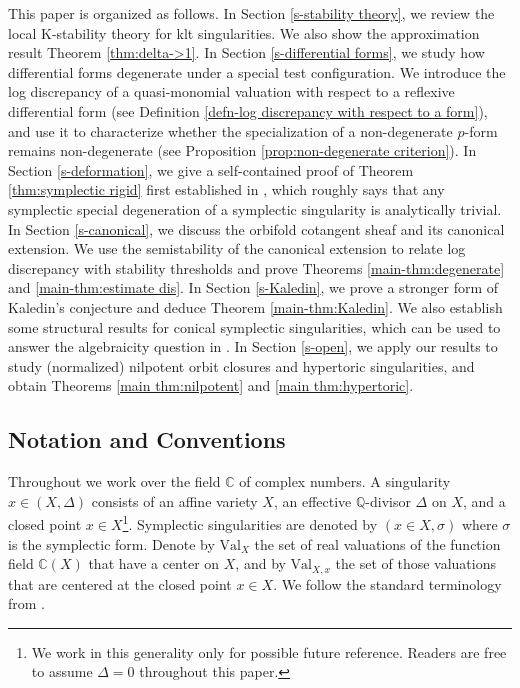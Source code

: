 \documentclass[12pt]{amsart}
\theoremstyle{definition}
\newcommand{\bC}{\mathbb{C}}
\newcommand{\bQ}{\mathbb{Q}}
\newcommand{\Val}{\mathrm{Val}}
\numberwithin{equation}{section}
\begin{document}
\medskip

This paper is organized as follows. In Section \ref{s-stability theory}, we review the local K-stability theory for klt singularities. We also show the approximation result Theorem \ref{thm:delta->1}. In Section \ref{s-differential forms}, we study how differential forms degenerate under a special test configuration. We introduce  the log discrepancy of a quasi-monomial valuation with respect to a reflexive differential form (see Definition \ref{defn-log discrepancy with respect to a form}), and use it to characterize whether the specialization of a non-degenerate $p$-form remains non-degenerate (see Proposition \ref{prop:non-degenerate criterion}). In Section \ref{s-deformation}, we give a self-contained proof of Theorem \ref{thm:symplectic rigid} first established in \cite{NO-symp}, which roughly says that any symplectic special degeneration of a symplectic singularity is analytically trivial. In Section \ref{s-canonical}, we discuss the orbifold cotangent sheaf and its canonical extension. We use the semistability of the canonical extension to relate log discrepancy with stability thresholds and prove Theorems \ref{main-thm:degenerate} and \ref{main-thm:estimate dis}. In Section \ref{s-Kaledin}, we prove a stronger form of Kaledin's conjecture and deduce Theorem \ref{main-thm:Kaledin}. We also establish some structural results for conical symplectic singularities, which can be used to answer the algebraicity question in \cite[Page 3]{Namikawa-torichyperkahler}. In Section \ref{s-open}, we apply our results to study (normalized) nilpotent orbit closures and hypertoric singularities, and obtain Theorems \ref{main thm:nilpotent} and \ref{main thm:hypertoric}. %


\subsection*{Notation and Conventions}

Throughout we work over the field $\bC$ of complex numbers. A singularity $x\in (X,\Delta)$ consists of an affine variety $X$, an effective $\bQ$-divisor $\Delta$ on $X$, and a closed point $x\in X$\footnote{We work in this generality only for possible future reference. Readers are free to assume $\Delta=0$ throughout this paper.}. Symplectic singularities are denoted by $(x\in X,\sigma)$ where $\sigma$ is the symplectic form. Denote by $\Val_{X}$ the set of real valuations of the function field $\bC(X)$ that have a center on $X$, and by $\Val_{X,x}$ the set of those valuations that are centered at the closed point $x\in X$. We follow the standard terminology from \cites{KM98, Kol13, Xu-book}. %
\end{document}
